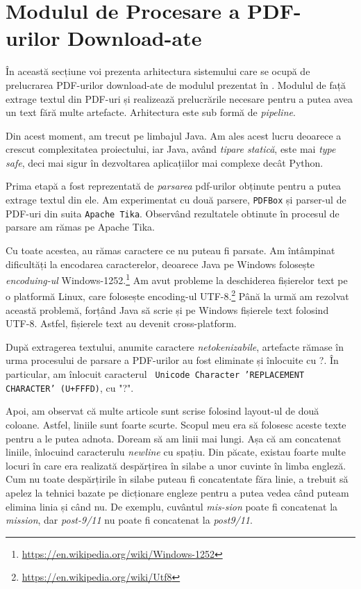 \section{Modulul de Procesare a PDF-urilor Download-ate}

În această secțiune voi prezenta arhitectura sistemului care se ocupă de prelucrarea PDF-urilor download-ate de modulul prezentat în  . Modulul de față extrage textul din PDF-uri și realizează prelucrările necesare pentru a putea avea un text fără multe artefacte. Arhitectura este sub formă de \textit{pipeline}.

Din acest moment, am trecut pe limbajul Java. Am ales acest lucru deoarece a crescut complexitatea proiectului, iar Java, având \textit{tipare statică}, este mai \textit{type safe}, deci mai sigur în dezvoltarea aplicațiilor mai complexe decât Python.

Prima etapă a fost reprezentată de \textit{parsarea} pdf-urilor obținute pentru a putea extrage textul din ele. Am experimentat cu două parsere, \texttt{PDFBox} și parser-ul de PDF-uri din suita \texttt{Apache Tika}. Observând rezultatele obtinute în procesul de parsare am rămas pe Apache Tika. 

Cu toate acestea, au rămas caractere ce nu puteau fi parsate. Am întâmpinat dificultăți la encodarea caracterelor, deoarece Java pe Windows folosește \textit{encoduing-ul} Windows-1252.\footnote{\url{https://en.wikipedia.org/wiki/Windows-1252}} Am avut probleme la deschiderea fișierelor text pe o platformă Linux, care folosește encoding-ul UTF-8.\footnote{\url{https://en.wikipedia.org/wiki/Utf8}} Până la urmă am rezolvat această problemă, forțând Java să scrie și pe Windows fișierele text folosind UTF-8. Astfel, fișierele text au devenit cross-platform.

După extragerea textului, anumite caractere \textit{netokenizabile}, artefacte rămase în urma procesului de parsare a PDF-urilor au fost eliminate și înlocuite cu ?. În particular, am înlocuit caracterul \texttt{
Unicode Character 'REPLACEMENT CHARACTER' (U+FFFD)}, cu "?".

Apoi, am observat că multe articole sunt scrise folosind layout-ul de două coloane. Astfel, liniile sunt foarte scurte. Scopul meu era să folosesc aceste texte pentru a le putea adnota. Doream să am linii mai lungi. Așa că am concatenat liniile, înlocuind caracterulu \textit{newline} cu spațiu. Din păcate, existau foarte multe locuri în care era realizată despărțirea în silabe a unor cuvinte în limba engleză. Cum nu toate despărțirile în silabe puteau fi concatentate făra linie, a trebuit să apelez la tehnici bazate pe dicționare engleze pentru a putea vedea când puteam elimina linia și când nu. De exemplu, cuvântul \textit{mis-sion} poate fi concatenat la \textit{mission}, dar \textit{post-9/11} nu poate fi concatenat la \textit{post9/11}.

